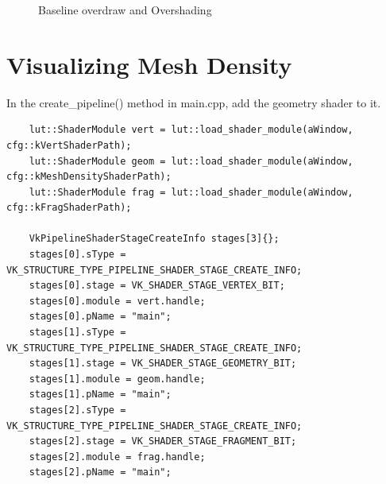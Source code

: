 \documentclass[10pt]{article}
\begin{document}
\begin{figure}[htbp]
	\centering
    \caption{Baseline overdraw and Overshading}
\end{figure}

\section{Visualizing Mesh Density}

\noindent In the create\_pipeline() method in main.cpp, add the geometry shader to it.

\begin{lstlisting}
    lut::ShaderModule vert = lut::load_shader_module(aWindow, cfg::kVertShaderPath);
    lut::ShaderModule geom = lut::load_shader_module(aWindow, cfg::kMeshDensityShaderPath);
    lut::ShaderModule frag = lut::load_shader_module(aWindow, cfg::kFragShaderPath);
    
    VkPipelineShaderStageCreateInfo stages[3]{};
    stages[0].sType = VK_STRUCTURE_TYPE_PIPELINE_SHADER_STAGE_CREATE_INFO;
    stages[0].stage = VK_SHADER_STAGE_VERTEX_BIT;
    stages[0].module = vert.handle;
    stages[0].pName = "main";
    stages[1].sType = VK_STRUCTURE_TYPE_PIPELINE_SHADER_STAGE_CREATE_INFO;
    stages[1].stage = VK_SHADER_STAGE_GEOMETRY_BIT;
    stages[1].module = geom.handle;
    stages[1].pName = "main";
    stages[2].sType = VK_STRUCTURE_TYPE_PIPELINE_SHADER_STAGE_CREATE_INFO;
    stages[2].stage = VK_SHADER_STAGE_FRAGMENT_BIT;
    stages[2].module = frag.handle;
    stages[2].pName = "main";
\end{lstlisting}
\end{document}
